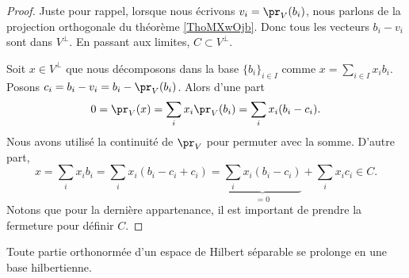 \begin{proof}
    Juste pour rappel, lorsque nous écrivons \( v_i=\pr_V(b_i)\), nous parlons de la projection orthogonale du théorème \ref{ThoMXwOjb}. Donc tous les vecteurs \( b_i-v_i\) sont dans \( V^{\perp}\). En passant aux limites, \( C\subset V^{\perp}\).

    Soit \( x\in V^{\perp}\) que nous décomposons dans la base \( \{ b_i \}_{i\in I}\) comme \( x=\sum_{i\in I}x_ib_i\). Posons \( c_i=b_i-v_i=b_i-\pr_V(b_i)\). Alors d'une part
    \begin{equation}
        0=\pr_V(x)=\sum_ix_i\pr_V(b_i)=\sum_ix_i(b_i-c_i).
    \end{equation}
    Nous avons utilisé la continuité de \( \pr_V\) pour permuter avec la somme. D'autre part,
    \begin{equation}
        x=\sum_ix_ib_i=\sum_ix_i(b_i-c_i+c_i)=\underbrace{\sum_ix_i(b_i-c_i)}_{=0}+\sum_ix_ic_i\in C.
    \end{equation}
    Notons que pour la dernière appartenance, il est important de prendre la fermeture pour définir \( C\).
\end{proof}

\begin{proposition}
    Toute partie orthonormée d'un espace de Hilbert séparable se prolonge en une base hilbertienne.
\end{proposition}

